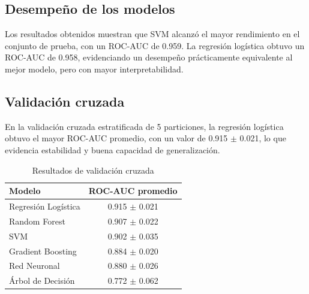 \documentclass[conference]{IEEEtran}
\begin{document}
\subsection{Desempeño de los modelos}

Los resultados obtenidos muestran que SVM alcanzó el mayor rendimiento en el conjunto de prueba, con un ROC-AUC de 0.959. La regresión logística obtuvo un ROC-AUC de 0.958, evidenciando un desempeño prácticamente equivalente al mejor modelo, pero con mayor interpretabilidad.

\begin{table}[htbp]
\caption{Desempeño de modelos de aprendizaje automático}
\begin{center}
\label{tab:modelos}
\end{center}
\end{table}

\subsection{Validación cruzada}

En la validación cruzada estratificada de 5 particiones, la regresión logística obtuvo el mayor ROC-AUC promedio, con un valor de 0.915 $\pm$ 0.021, lo que evidencia estabilidad y buena capacidad de generalización.

\begin{table}[htbp]
\caption{Resultados de validación cruzada}
\begin{center}
\begin{tabular}{lc}
\toprule
\textbf{Modelo} & \textbf{ROC-AUC promedio} \\
\midrule
Regresión Logística & 0.915 $\pm$ 0.021 \\
Random Forest & 0.907 $\pm$ 0.022 \\
SVM & 0.902 $\pm$ 0.035 \\
Gradient Boosting & 0.884 $\pm$ 0.020 \\
Red Neuronal & 0.880 $\pm$ 0.026 \\
Árbol de Decisión & 0.772 $\pm$ 0.062 \\
\bottomrule
\end{tabular}
\label{tab:validacion}
\end{center}
\end{table}
\end{document}
